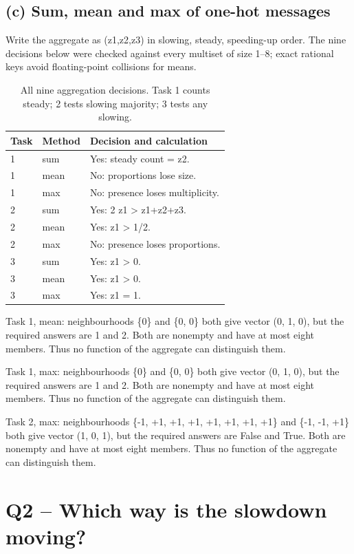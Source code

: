 \documentclass[11pt,a4paper]{article}
\begin{document}
\subsection{(c) Sum, mean and max of one-hot messages}
Write the aggregate as (z1,z2,z3) in slowing, steady, speeding-up order. The nine decisions below were checked against every multiset of size 1–8; exact rational keys avoid floating-point collisions for means.

\begin{table}[htbp]\centering\small\caption{All nine aggregation decisions. Task 1 counts steady; 2 tests slowing majority; 3 tests any slowing.}\begin{tabular}{llp{10cm}}\toprule
Task & Method & Decision and calculation\\\midrule
1 & sum & Yes: steady count = z2.\\
1 & mean & No: proportions lose size.\\
1 & max & No: presence loses multiplicity.\\
2 & sum & Yes: 2 z1 > z1+z2+z3.\\
2 & mean & Yes: z1 > 1/2.\\
2 & max & No: presence loses proportions.\\
3 & sum & Yes: z1 > 0.\\
3 & mean & Yes: z1 > 0.\\
3 & max & Yes: z1 = 1.\\
\bottomrule\end{tabular}\end{table}
Task 1, mean: neighbourhoods \{0\} and \{0, 0\} both give vector (0, 1, 0), but the required answers are 1 and 2. Both are nonempty and have at most eight members. Thus no function of the aggregate can distinguish them.

Task 1, max: neighbourhoods \{0\} and \{0, 0\} both give vector (0, 1, 0), but the required answers are 1 and 2. Both are nonempty and have at most eight members. Thus no function of the aggregate can distinguish them.

Task 2, max: neighbourhoods \{-1, +1, +1, +1, +1, +1, +1, +1\} and \{-1, -1, +1\} both give vector (1, 0, 1), but the required answers are False and True. Both are nonempty and have at most eight members. Thus no function of the aggregate can distinguish them.

\section{Q2 -- Which way is the slowdown moving?}
\end{document}
